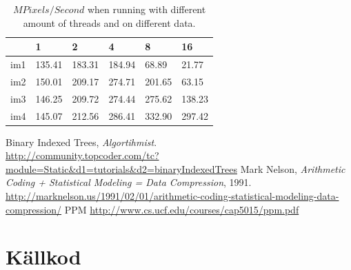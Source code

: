 \documentclass[a4paper,11pt]{article}
\begin{document}
\begin{table}[h!]
  \label{mpixelspersecond}
  \caption{$MPixels/Second$ when running with different amount of threads and on different data.}
  \begin{tabular}[h]{|l|l|l|l|l|l|}
    \hline
                  & 1     & 2     & 4     & 8     & 16\\
    \hline
    im1           & 135.41 & 183.31 & 184.94 & 68.89  & 21.77\\ 
    im2           & 150.01 & 209.17 & 274.71 & 201.65 & 63.15\\ 
    im3           & 146.25 & 209.72 & 274.44 & 275.62 & 138.23\\ 
    im4           & 145.07 & 212.56 & 286.41 & 332.90 & 297.42\\
    \hline
  \end{tabular}
\end{table}

\cite{fenwick}
\clearpage
\begin{thebibliography}{9}
    Binary Indexed Trees,
    \emph{Algortihmist}.\\
    \url{http://community.topcoder.com/tc?module=Static\&d1=tutorials\&d2=binaryIndexedTrees}
    Mark Nelson,
    \emph{Arithmetic Coding + Statistical Modeling = Data Compression}, 1991.\\
    \url{http://marknelson.us/1991/02/01/arithmetic-coding-statistical-modeling-data-compression/}
    PPM
    \url{http://www.cs.ucf.edu/courses/cap5015/ppm.pdf}

\end{thebibliography}

\clearpage
\section{Källkod}
%
%
%
%
%
%
\end{document}
